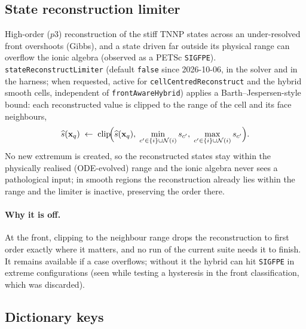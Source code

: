\documentclass[11pt,a4paper]{article}
\newcommand{\code}[1]{\texttt{\small #1}}
\newcommand{\dictkey}[1]{\textcolor{black!60!green}{\texttt{\footnotesize #1}}}
\begin{document}
\subsection{State reconstruction limiter}
\label{sec:limiter}

High-order ($p3$) reconstruction of the stiff TNNP states across an
under-resolved front overshoots (Gibbs), and a state driven far outside its
physical range can overflow the ionic algebra (observed as a PETSc
\code{SIGFPE}). \dictkey{stateReconstructLimiter} (default \code{false} since
2026-10-06, in the solver and in the harness; when requested, active
for \code{cellCentredReconstruct} and the hybrid smooth cells, independent of
\dictkey{frontAwareHybrid}) applies a Barth--Jespersen-style bound: each
reconstructed value is clipped to the range of the cell and its face neighbours,
\begin{equation}
  \widehat{s}(\mathbf{x}_q)
  \;\leftarrow\;
  \mathrm{clip}\!\Bigl(\widehat{s}(\mathbf{x}_q),\;
     \min_{c'\in\{i\}\cup\mathcal{N}(i)} s_{c'},\;
     \max_{c'\in\{i\}\cup\mathcal{N}(i)} s_{c'}\Bigr).
  \label{eq:limiter}
\end{equation}
No new extremum is created, so the reconstructed states stay within the
physically realised (ODE-evolved) range and the ionic algebra never sees a
pathological input; in smooth regions the reconstruction already lies within the
range and the limiter is inactive, preserving the order there.

\paragraph{Why it is off.} At the front, clipping to the neighbour range drops the
reconstruction to first order exactly where it matters, and no run of the current
suite needs it to finish. It remains available if a case overflows; without it the
hybrid can hit \code{SIGFPE} in extreme configurations (seen while testing a
hysteresis in the front classification, which was discarded).

\subsection{Dictionary keys}
\end{document}
